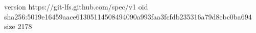 version https://git-lfs.github.com/spec/v1
oid sha256:5019e16459aace61305114508494090a993faa3fcfdb235316a79d8cbc0ba694
size 2178
